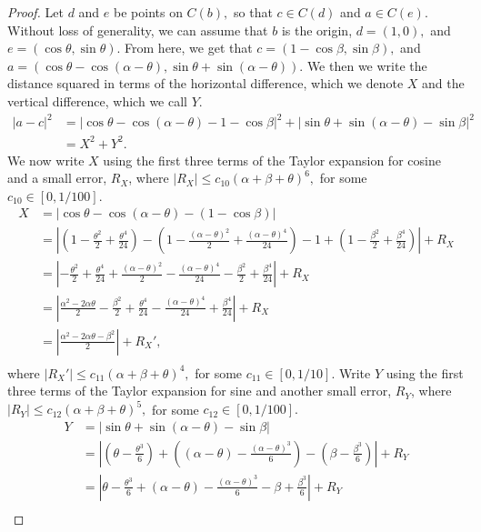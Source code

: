 \documentclass[12pt]{article}
\begin{document}
\begin{proof}
Let $d$ and $e$ be points on $C(b),$ so that $c\in C(d)$ and $a\in C(e).$ Without loss of generality, we can assume that $b$ is the origin, $d=(1,0),$ and $e=(\cos\theta, \sin \theta).$ From here, we get that $c=(1-\cos\beta,\sin \beta),$ and $a=(\cos\theta-\cos(\alpha-\theta),\sin\theta+\sin(\alpha-\theta))$. We then we write the distance squared in terms of the horizontal difference, which we denote $X$ and the vertical difference, which we call $Y$.
\begin{align*}
|a-c|^2&=|\cos\theta-\cos(\alpha-\theta)-1-\cos\beta|^2+|\sin\theta+\sin(\alpha-\theta)-\sin \beta|^2\\
&= X^2+Y^2.
\end{align*}
We now write $X$ using the first three terms of the Taylor expansion for cosine and a small error, $R_X$, where $|R_X|\leq c_{10}(\alpha+\beta+\theta)^6,$ for some $c_{10}\in [0,1/100].$
\begin{align*}
X&=|\cos\theta-\cos(\alpha-\theta)-(1-\cos\beta)|\\
&= \left|\left(1-\frac{\theta^2}{2} +\frac{\theta^4}{24}\right)- \left(1-\frac{(\alpha-\theta)^2}{2} +\frac{(\alpha-\theta)^4}{24}\right)-1+\left(1-\frac{\beta^2}{2}+\frac{\beta^4}{24} \right)\right|+R_X\\
&=\left|-\frac{\theta^2}{2} +\frac{\theta^4}{24}+\frac{(\alpha-\theta)^2}{2} -\frac{(\alpha-\theta)^4}{24}-\frac{\beta^2}{2}+\frac{\beta^4}{24}\right|+R_X\\
&=\left|\frac{\alpha^2-2\alpha\theta}{2}-\frac{\beta^2}{2}+\frac{\theta^4}{24} -\frac{(\alpha-\theta)^4}{24}+\frac{\beta^4}{24}\right|+R_X\\
&= \left|\frac{\alpha^2-2\alpha\theta-\beta^2}{2}\right|+R_X',\\
\end{align*}
where $|R_X'|\leq c_{11}(\alpha+\beta+\theta)^4,$ for some $c_{11}\in [0,1/10].$ Write $Y$ using the first three terms of the Taylor expansion for sine and another small error, $R_Y$, where $|R_Y|\leq c_{12}(\alpha+\beta+\theta)^5,$ for some $c_{12}\in [0,1/100].$
\begin{align*}
Y&=|\sin\theta+\sin(\alpha-\theta)-\sin \beta|\\
&=\left| \left(\theta-\frac{\theta^3}{6} \right)+\left((\alpha-\theta)-\frac{(\alpha-\theta)^3}{6} \right)-\left(\beta-\frac{\beta^3}{6} \right)\right|+R_Y\\
&=\left| \theta-\frac{\theta^3}{6} +(\alpha-\theta)-\frac{(\alpha-\theta)^3}{6} -\beta+\frac{\beta^3}{6}\right|+R_Y\\

\end{align*}
\end{proof}
\end{document}

